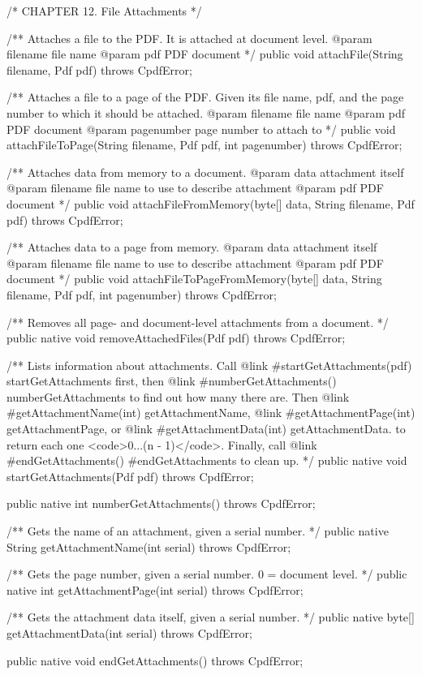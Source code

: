 /* CHAPTER 12. File Attachments */

/** Attaches a file to the PDF. It is attached at document level.
@param filename file name
@param pdf PDF document */
public void attachFile(String filename, Pdf pdf) throws CpdfError;

/** Attaches a file to a page of the PDF. Given its file name, pdf, and the
page number to which it should be attached.
@param filename file name
@param pdf PDF document
@param pagenumber page number to attach to */
public void attachFileToPage(String filename, Pdf pdf, int pagenumber)
    throws CpdfError;

/** Attaches data from memory to a document.
@param data attachment itself
@param filename file name to use to describe attachment
@param pdf PDF document */
public void attachFileFromMemory(byte[] data, String filename, Pdf pdf)
    throws CpdfError;

/** Attaches data to a page from memory.
@param data attachment itself
@param filename file name to use to describe attachment
@param pdf PDF document */
public void attachFileToPageFromMemory(byte[] data, String filename,
                                       Pdf pdf, int pagenumber)
    throws CpdfError;

/** Removes all page- and document-level attachments from a document. */
public native void removeAttachedFiles(Pdf pdf) throws CpdfError;

/** Lists information about attachments. Call
{@link #startGetAttachments(pdf) startGetAttachments} first, then {@link
#numberGetAttachments() numberGetAttachments} to find out how many there are.
Then {@link #getAttachmentName(int) getAttachmentName}, {@link
#getAttachmentPage(int) getAttachmentPage}, or {@link #getAttachmentData(int)
getAttachmentData}. to return each one <code>0...(n - 1)</code>. Finally, call
{@link #endGetAttachments() #endGetAttachments} to clean up. */
public native void startGetAttachments(Pdf pdf) throws CpdfError;

public native int numberGetAttachments() throws CpdfError;

/** Gets the name of an attachment, given a serial number. */
public native String getAttachmentName(int serial) throws CpdfError;

/** Gets the page number, given a serial number. 0 = document level. */
public native int getAttachmentPage(int serial) throws CpdfError;

/** Gets the attachment data itself, given a serial number. */
public native byte[] getAttachmentData(int serial) throws CpdfError;

public native void endGetAttachments() throws CpdfError; 
